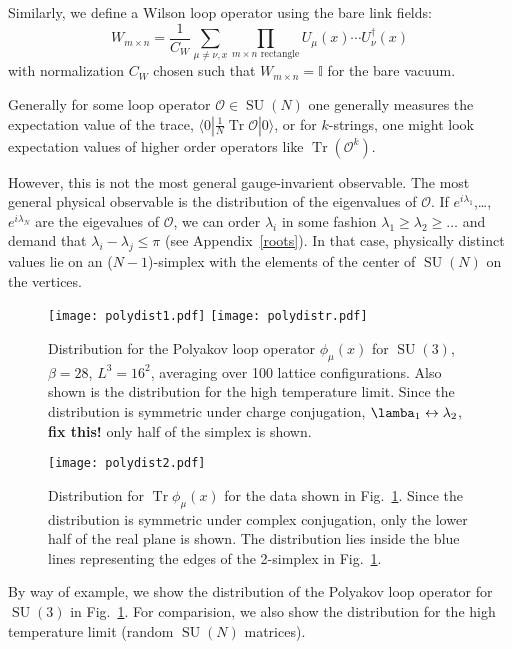 \documentclass[preprint,aps,prd]{revtex4-2}
\newcommand{\be}{\begin{equation}}
\newcommand{\eq}{\end{equation}}
\DeclareMathOperator{\SU}{SU}
\DeclareMathOperator{\Tr}{Tr}
\begin{document}
Similarly, we define a Wilson loop operator using the bare link
fields:
\be
       W_{m\times n} = \frac{1}{C_W} \sum_{\mu \ne \nu, x}
         \prod_{\mbox{$m\times n$ rectangle}}
         U_\mu(x) \cdots U_\nu^\dagger (x)
\eq
with normalization $C_W$ chosen such that $W_{m\times n} = \mathbb{I}$
for the bare vacuum.

Generally for some loop operator $\mathcal{O}\in\SU(N)$ one generally
measures the expectation value of the trace,
$\langle 0 | \frac{1}{N} \Tr \mathcal{O} |0\rangle$, or for $k$-strings,
one might look expectation values of higher order operators
like $\Tr\left( \mathcal{O}^k\right)$.

However, this is not the most general gauge-invarient observable.
The most general physical observable is the distribution of the
eigenvalues of $\mathcal{O}$.  If $e^{i\lambda_1}$,\ldots, $e^{i\lambda_N}$
are the eigevalues of $\mathcal{O}$, we can order $\lambda_i$ in
some fashion $\lambda_1\ge \lambda_2 \ge \ldots$ and demand that
$\lambda_i-\lambda_j\le \pi$ (see Appendix~\ref{roots}).
In that case, physically
distinct values lie on an ($N-1$)-simplex with the elements of the
center of $\SU(N)$ on the vertices.

\begin{figure}
  \texttt{[image: polydist1.pdf]}
  \texttt{[image: polydistr.pdf]}
  \caption{Distribution for the Polyakov loop operator
    $\phi_\mu(x)$ for $\SU(3)$, $\beta=28$, $L^3=16^2$,
    averaging over 100 lattice configurations.
    Also shown is the distribution for the high temperature
    limit.  Since the distribution is symmetric under charge
    conjugation, $\lamba_1 \leftrightarrow \lambda_2$, {\bf fix this!}
    only half of the simplex is shown.
   \label{polydist1}}
\end{figure}
\begin{figure}
  \texttt{[image: polydist2.pdf]}
  \caption{Distribution for $\Tr \phi_\mu(x)$ for
    the data shown in Fig.~\ref{polydist1}.  Since
    the distribution is symmetric under complex conjugation,
    only the lower half of the real plane is shown.
    The distribution lies inside the blue lines representing
    the edges of the 2-simplex in Fig.~\ref{polydist1}.
    \label{polydist2}}
\end{figure}

By way of example, we show the distribution of the
Polyakov loop operator for $\SU(3)$ in Fig.~\ref{polydist1}.
For comparision, we also show the distribution for
the high temperature limit (random $\SU(N)$ matrices).
\end{document}
